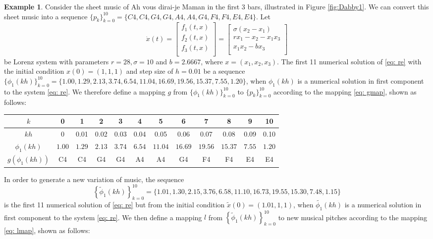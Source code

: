 \documentclass[11pt]{article}
\theoremstyle{definition}
\newtheorem{example}[theorem]{Example}
\begin{document}
\begin{example}
Consider the sheet music of Ah vous dirai-je Maman \cite{hinson_12_1987} in the first 3 bars, illustrated in Figure \ref{fig:Dabby1}. We can convert this sheet music into a sequence $\{p_k\}_{k=0}^{10} = \{C4, C4, G4, G4, A4, A4, G4, F4, F4, E4, E4 \}$. Let 
\begin{equation} \label{eq: re}
\dot{x}(t) = \begin{bmatrix}
 f_1(t, x) \\
 f_2(t, x) \\
 f_3(t, x) \\
\end{bmatrix}
= 
\begin{bmatrix}
  \sigma(x_2 - x_1) \\
  rx_1 - x_2 - x_1x_3 \\
  x_1x_2 - bx_3 \\
\end{bmatrix}
\end{equation} 
be Lorenz system with parameters $r = 28, \sigma=10$ and $b = 2.6667$, where $x = (x_1, x_2, x_3)$. The first 11 numerical solution of \eqref{eq: re} with the initial condition $x(0) = (1,1,1)$ and step size of $h=0.01$ be a sequence $\{ \phi_1(kh) \}_{k=0}^{10} = \{1.00, 1.29, 2.13, 3.74, 6.54, 11.04, 16.69, 19.56, 15.37, 7.55, 1.20\}$, when $\phi_1(kh)$ is a numerical solution in first component to the system \eqref{eq: re}. We therefore define a mapping $g$ from $\{ \phi_1(kh) \}_{k=0}^{10}$ to $\{p_k\}_{k=0}^{10}$ according to the mapping \eqref{eq: gmap}, shown as follows:

\begin{center}
\begin{tabular}{|c||c|c|c|c|c|c|c|c|c|c|c|}
\hline
$k$ & 0 & 1 & 2 & 3 & 4 & 5 & 6 & 7 & 8 & 9 & 10 \\
\hline
$kh$ & 0 & 0.01 & 0.02 & 0.03 & 0.04 & 0.05 & 0.06 & 0.07 & 0.08 & 0.09 & 0.10 \\
\hline
$\phi_1(kh)$ & $1.00$ & $1.29$ & $2.13$ & $3.74$ & $6.54$ & $11.04$ & $16.69$ & $19.56$ & $15.37$ & $7.55$ & $1.20$ \\
\hline
$g(\phi_1(kh))$ & C4 & C4 & G4 & G4 & A4 & A4 & G4 & F4 & F4 & E4 & E4  \\
\hline
\end{tabular}
\end{center}

In order to generate a new variation of music, the sequence 
\[ \left\{\tilde{\phi}_1(kh) \right\}_{k=0}^{10} = \{ 1.01, 1.30, 2.15, 3.76, 6.58, 11.10, 16.73, 19.55, 15.30, 7.48, 1.15 \} \] 
is the first 11 numerical solution of \eqref{eq: re} but from the initial condition $\tilde{x}(0) = (1.01,1,1)$, when $\tilde{\phi_1}(kh)$ is a numerical solution in first component to the system \eqref{eq: re}. We then define a mapping $l$ from $\left\{\tilde{\phi}_1(kh) \right\}_{k=0}^{10}$ to new musical pitches according to the mapping \eqref{eq: lmap}, shown as follows:


\end{example}
\end{document}
